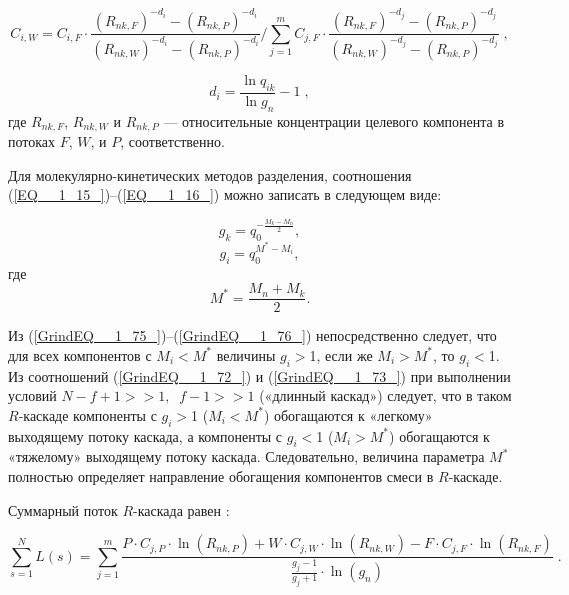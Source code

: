 \begin{equation} \label{GrindEQ__1_73_} 
  C_{i,W}=C_{i,F} \cdot \frac{\left(R_{n k,F}\right)^{-d_{i}}-\left(R_{n k,P}\right)^{-d_{i}}}{\left(R_{n k,W}\right)^{-d_{i}}-\left(R_{n k,P}\right)^{-d_{i}}} / \sum_{j=1}^{m} C_{j,F} \cdot \frac{\left(R_{n k,F}\right)^{-d_{j}}-\left(R_{n k,P}\right)^{-d_{j}}}{\left(R_{n k,W}\right)^{-d_{j}}-\left(R_{n k,P}\right)^{-d_{j}}}\; ,
\end{equation} 

\begin{equation} \label{GrindEQ__1_74_} 
  d_{i} =\frac{\ln q_{ik} }{\ln g_{n} } -1 \; ,              
\end{equation}
где $R_{n k,F}$, $R_{n k,W}$ и $R_{n k,P}$ --- относительные концентрации целевого компонента в потоках $F$, $W$, и $P$, соответственно.

Для молекулярно-кинетических методов разделения, соотношения (\ref{EQ__1_15_})--(\ref{EQ__1_16_}) можно записать в следующем виде:

\begin{equation} \label{GrindEQ__1_75_} 
  g_{k} =q_{0}^{-\frac{M_{k} -M_{n} }{2} } ,        
\end{equation} 
\begin{equation} \label{GrindEQ__1_76_} 
  g_{i} =q_{0}^{M^{*} -M_{i} } ,        
\end{equation} 
где 
\begin{equation} \label{EQ_Mstar} 
  M^{*} =\frac{M_{n} +M_{k} }{2}.    
\end{equation} 

Из (\ref{GrindEQ__1_75_})--(\ref{GrindEQ__1_76_}) непосредственно следует, что для всех компонентов с $M_{i} $$\mathrm{<}$$M^{*} $ величины $g_{i} $$\mathrm{>}$1, если же $M_{i} $$\mathrm{>}$$M^{*} $, то $g_{i} $$\mathrm{<}$1. Из соотношений (\ref{GrindEQ__1_72_}) и (\ref{GrindEQ__1_73_}) при выполнении условий $N-f+1>>1,\; \; f-1>>1$ («длинный каскад») следует, что в таком $R$-каскаде компоненты с $g_{i} $$\mathrm{>}$1 ($M_{i} $$\mathrm{<}$$M^{*}$) обогащаются к «легкому» выходящему потоку каскада, а компоненты с $g_{i} $$\mathrm{<}$1 ($M_{i} $$\mathrm{>}$$M^{*}$) обогащаются к «тяжелому» выходящему потоку каскада. Следовательно, величина параметра $M^{*}$ полностью определяет направление обогащения компонентов смеси в $R$-каскаде. 

Суммарный поток $R$-каскада равен \cite{sulaberidzeTeoriyaKaskadovDlya2011}:

\begin{equation} \label{GrindEQ__1_77_} 
  \sum _{s=1}^{N}L(s) =\sum _{j=1}^{m}\frac{P \cdot C_{j,P} \cdot \ln(R_{nk,P}) +W \cdot C_{j,W} \cdot \ln(R_{nk,W}) -F \cdot C_{j,F} \cdot \ln(R_{nk,F})}{\frac{g_{j} -1}{g_{j} +1} \cdot \ln(g_{n})} \; .             
\end{equation} 

